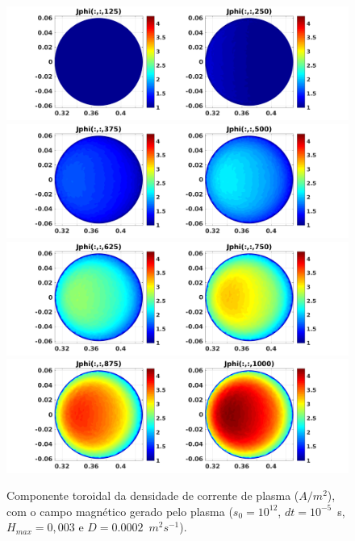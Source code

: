 \documentclass[12pt,oneside,a4paper]{abntex2}
\begin{document}
\begin{figure}[H]
\centering
\includegraphics[scale=0.5]{../SImulacao_breakdown/PDE/Jphitod1B7.png}  
\includegraphics[scale=0.5]{../SImulacao_breakdown/PDE/Jphitod2B7.png} 
\includegraphics[scale=0.5]{../SImulacao_breakdown/PDE/Jphitod3B7.png} 
\includegraphics[scale=0.5]{../SImulacao_breakdown/PDE/Jphitod4B7.png} 
\caption{Componente toroidal da densidade de corrente de plasma ($A/m^2$), com o campo magnético gerado pelo plasma ($s_0=10^{12}$, $dt=10^{-5}$\ s, $H_{max} = 0,003$ e $D=0.0002$\ $m^2s^{-1}$).}
\label{campplasmasi3l2}
\end{figure}
\end{document}
